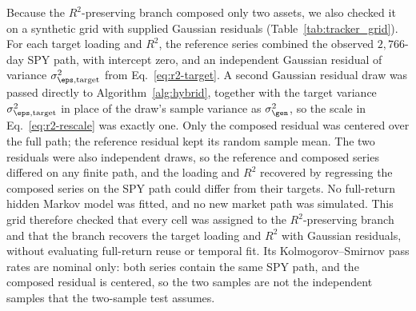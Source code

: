 Because the $R^2$-preserving branch composed only two assets, we also
checked it on a synthetic grid with supplied Gaussian residuals
(Table~\ref{tab:tracker_grid}). For each target loading and $R^2$, the
reference series combined the observed $2{,}766$-day SPY path, with
intercept zero, and an independent Gaussian residual of variance
$\sigma_{\eps,\mathrm{target}}^2$ from Eq.~\eqref{eq:r2-target}. A
second Gaussian residual draw was passed directly to
Algorithm~\ref{alg:hybrid}, together with the target variance
$\sigma_{\eps,\mathrm{target}}^2$ in place of the draw's sample
variance as $\sigma_{\gen}^2$, so the scale in
Eq.~\eqref{eq:r2-rescale} was exactly one. Only the composed residual
was centered over the full path; the reference residual kept its
random sample mean. The two residuals were also independent draws, so
the reference and composed series differed on any finite path, and
the loading and $R^2$ recovered by regressing the composed series on
the SPY path could differ from their targets. No full-return hidden
Markov model was fitted, and no new market path was simulated. This
grid therefore checked that every cell was assigned to the
$R^2$-preserving branch and that the branch recovers the target
loading and $R^2$ with Gaussian residuals, without evaluating
full-return reuse or temporal fit. Its Kolmogorov--Smirnov pass rates
are nominal only: both series contain the same SPY path, and the
composed residual is centered, so the two samples are not the
independent samples that the two-sample test assumes.

